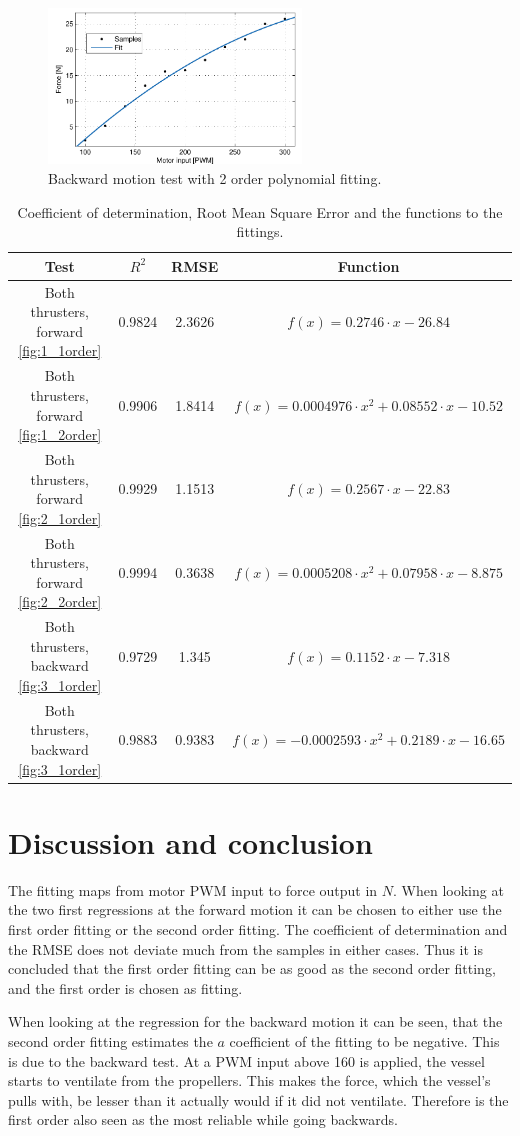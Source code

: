\begin{figure}[htbp]
	\centering
	\includegraphics[width=0.6\textwidth]{plot/both_force_3_2order}
	\caption{Backward motion test with 2 order polynomial fitting.}
	\label{fig:3_2order}
\end{figure}

\begin{table}[htbp]
\centering
\begin{tabular}{cccc}
	\toprule
  Test & $R^2$ & RMSE & Function\\
  \midrule
  Both thrusters, forward \ref{fig:1_1order} & 0.9824 & 2.3626 & $f(x)=0.2746\cdot x-26.84$\\
  Both thrusters, forward \ref{fig:1_2order} & 0.9906 & 1.8414 & $f(x)=0.0004976\cdot x^2+0.08552\cdot x-10.52$\\
  Both thrusters, forward \ref{fig:2_1order} & 0.9929 & 1.1513 & $f(x)=0.2567\cdot x-22.83$\\
  Both thrusters, forward \ref{fig:2_2order} & 0.9994 & 0.3638 & $f(x)=0.0005208\cdot x^2+0.07958\cdot x-8.875$\\
  Both thrusters, backward \ref{fig:3_1order} & 0.9729 & 1.345 & $f(x)=0.1152\cdot x-7.318$\\
  Both thrusters, backward \ref{fig:3_1order} & 0.9883 & 0.9383 & $f(x)=-0.0002593\cdot x^2+0.2189\cdot x-16.65$\\
  \bottomrule
\end{tabular}
\caption{Coefficient of determination, Root Mean Square Error and the functions to the fittings.}
\label{tab:fitting}
\end{table}

\section{Discussion and conclusion}
The fitting maps from motor \ac{PWM} input to force output in $N$. When looking at the two first regressions at the forward motion it can be chosen to either use the first order fitting or the second order fitting. The coefficient of determination and the RMSE does not deviate much from the samples in either cases. Thus it is concluded that the first order fitting can be as good as the second order fitting, and the first order is chosen as fitting.

When looking at the regression for the backward motion it can be seen, that the second order fitting estimates the $a$ coefficient of the fitting to be negative. This is due to the backward test. At a \ac{PWM} input above 160 is applied, the vessel starts to ventilate from the propellers. This makes the force, which the vessel's pulls with, be lesser than it actually would if it did not ventilate. Therefore is the first order also seen as the most reliable while going backwards.
